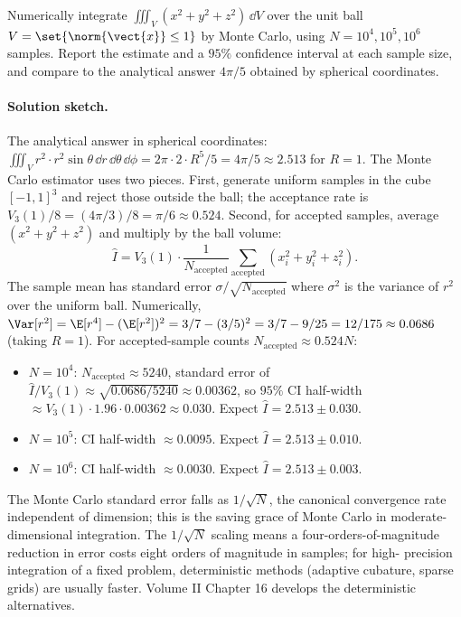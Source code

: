 \begin{exercise}
Numerically integrate $\iiint_{V} (x^{2} + y^{2} + z^{2})\,\dd V$
over the unit ball $V = \set{\norm{\vect{x}} \leq 1}$ by Monte
Carlo, using $N = 10^{4}, 10^{5}, 10^{6}$ samples. Report the
estimate and a $95\%$ confidence interval at each sample size, and
compare to the analytical answer $4\pi/5$ obtained by spherical
coordinates.

\paragraph{Solution sketch.} The analytical answer in spherical
coordinates: $\iiint_{V} r^{2} \cdot r^{2}\sin\theta\,\dd r\,\dd
\theta\,\dd\phi = 2\pi \cdot 2 \cdot R^{5}/5 = 4\pi/5 \approx 2.513$
for $R = 1$. The Monte Carlo estimator uses two pieces. First,
generate uniform samples in the cube $[-1, 1]^{3}$ and reject those
outside the ball; the acceptance rate is $V_{3}(1)/8 = (4\pi/3)/8
= \pi/6 \approx 0.524$. Second, for accepted samples, average
$(x^{2} + y^{2} + z^{2})$ and multiply by the ball volume:
\[
\hat{I} = V_{3}(1) \cdot \frac{1}{N_{\text{accepted}}}
\sum_{\text{accepted}} (x_{i}^{2} + y_{i}^{2} + z_{i}^{2}).
\]
The sample mean has standard error $\sigma/\sqrt{N_{\text{accepted}}
}$ where $\sigma^{2}$ is the variance of $r^{2}$ over the uniform
ball. Numerically, $\Var[r^{2}] = \E[r^{4}] - (\E[r^{2}])^{2} =
3/7 - (3/5)^{2} = 3/7 - 9/25 = 12/175 \approx 0.0686$ (taking
$R = 1$). For accepted-sample counts $N_{\text{accepted}} \approx
0.524 N$:
\begin{itemize}[leftmargin=*]
  \item $N = 10^{4}$: $N_{\text{accepted}} \approx 5240$, standard
    error of $\hat{I}/V_{3}(1) \approx \sqrt{0.0686/5240} \approx
    0.00362$, so $95\%$ CI half-width $\approx V_{3}(1) \cdot
    1.96 \cdot 0.00362 \approx 0.030$. Expect $\hat{I} = 2.513
    \pm 0.030$.
  \item $N = 10^{5}$: CI half-width $\approx 0.0095$. Expect
    $\hat{I} = 2.513 \pm 0.010$.
  \item $N = 10^{6}$: CI half-width $\approx 0.0030$. Expect
    $\hat{I} = 2.513 \pm 0.003$.
\end{itemize}
The Monte Carlo standard error falls as $1/\sqrt{N}$, the canonical
convergence rate independent of dimension; this is the saving
grace of Monte Carlo in moderate-dimensional integration. The
$1/\sqrt{N}$ scaling means a four-orders-of-magnitude reduction in
error costs eight orders of magnitude in samples; for high-
precision integration of a fixed problem, deterministic methods
(adaptive cubature, sparse grids) are usually faster. Volume II
Chapter 16 develops the deterministic alternatives.
\end{exercise}

